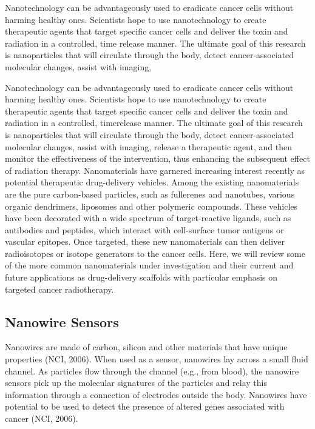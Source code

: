 \documentclass{article}
\begin{document}
\begin{multicols}
Nanotechnology can be advantageously
used to eradicate cancer cells without
harming healthy ones. Scientists hope to use nanotechnology to create therapeutic agents that target specific cancer cells and deliver the toxin and radiation in a controlled, time release manner. The ultimate goal of this research is nanoparticles that will circulate through the body, detect cancer-associated molecular changes, assist with imaging, 


Nanotechnology can be advantageously
used to eradicate cancer cells without
harming healthy ones. Scientists hope to use nanotechnology to create therapeutic agents that target specific cancer cells and deliver the toxin and radiation in a controlled, timerelease manner. The ultimate goal of this research is nanoparticles that will circulate through the body, detect cancer-associated molecular changes, assist with imaging, release a therapeutic agent, and then monitor the effectiveness of the intervention, thus enhancing the subsequent effect of radiation therapy. Nanomaterials have garnered increasing interest recently as potential therapeutic drug-delivery vehicles. Among the existing nanomaterials are the pure carbon-based particles, such as fullerenes and nanotubes, various organic dendrimers, liposomes and other polymeric compounds. These vehicles have been decorated with a wide spectrum of target-reactive ligands, such as antibodies and peptides, which interact with cell-surface tumor antigens or vascular epitopes. Once targeted, these new nanomaterials can then deliver radioisotopes or isotope generators to the cancer cells. Here, we will review some of the more common nanomaterials under investigation and their current and future applications as drug-delivery scaffolds with particular emphasis on targeted cancer radiotherapy.

\subsection{Nanowire Sensors}
Nanowires are made of carbon, silicon
and other materials that have unique
properties (NCI, 2006). When used as a
sensor, nanowires lay across a small fluid
channel. As particles flow through the channel (e.g., from blood), the nanowire sensors pick up the molecular signatures of the particles and relay this information through a connection of electrodes outside the body. Nanowires have potential to be used to detect the presence of altered genes
associated with cancer (NCI, 2006).


\end{multicols}
\end{document}
